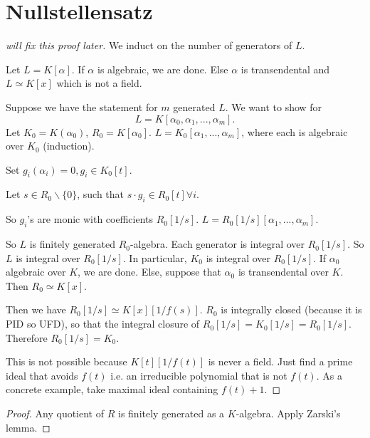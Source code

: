 \section{Nullstellensatz}

\begin{proof}[will fix this proof later]
    We induct on the number of generators of $L$. 

    Let $L=K[\alpha]$. If $\alpha$ is algebraic, we are done. Else $\alpha$ is transendental and $L \simeq K[x]$ which is not a field.

    Suppose we have the statement for $m$ generated $L$. We want to show for \[
    L=K[\alpha_0,\alpha_1,...,\alpha_m].
    \]
    Let $K_0=K(\alpha_0)$, $R_0=K[\alpha_0]$. 
    $L=K_0[\alpha_1,...,\alpha_m]$, where each is algebraic over $K_0$ (induction).

    Set $g_i(\alpha_i)=0,g_i\in K_0[t]$.

    Let $s\in R_0\backslash \{0\}$, such that $s\cdot g_i\in R_0[t]\forall i$.

    So $g_i$'s are monic with coefficients $R_0[1/s]$. $L=R_0[1/s][\alpha_1,...,\alpha_m]$.

    So $L$ is finitely generated $R_0$-algebra. Each generator is integral over $R_0[1/s]$. So $L$ is integral over $R_0[1/s]$. In particular, $K_0$ is integral over $R_0[1/s]$. If $\alpha_0$ algebraic over $K$, we are done. Else, suppose that $\alpha_0$ is transendental over $K$. Then $R_0\simeq K[x]$.

    Then we have $R_0[1/s]\simeq K[x][1/f(s)]$. $R_0$ is integrally closed (because it is PID so UFD), so that the integral closure of $R_0[1/s]=K_0[1/s]=R_0[1/s].$ Therefore $R_0[1/s]=K_0$.

    This is not possible because $K[t][1/f(t)]$ is never a field. Just find a prime ideal that avoids $f(t)$ i.e. an irreducible polynomial that is not $f(t)$. As a concrete example, take maximal ideal containing $f(t)+1$. 
\end{proof}


\begin{proof}
    Any quotient of $R$ is finitely generated as a $K$-algebra. Apply Zarski's lemma.
\end{proof}

